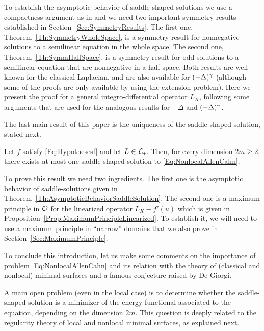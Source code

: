 To establish the asymptotic behavior of saddle-shaped solutions we use a compactness argument as in \cite{CabreTerraII, Cinti-Saddle, Cinti-Saddle2} and we need two important symmetry results established in Section~\ref{Sec:SymmetryResults}. The first one, Theorem~\ref{Th:SymmetryWholeSpace}, is a symmetry result for nonnegative solutions to a semilinear equation in the whole space. The second one, Theorem~\ref{Th:SymmHalfSpace}, is a symmetry result for odd solutions to a semilinear equation that are nonnegative in a half-space. Both results are well known for the classical Laplacian, and are also available for $(-\Delta)^\gamma$ (although some of the proofs are only available by using the extension problem). Here we present the proof for a general integro-differential operator $L_K$, following some arguments that are used for the analogous results for $-\Delta$ and $(-\Delta)^\gamma$.

The last main result of this paper is the uniqueness of the saddle-shaped solution, stated next.

\begin{theorem}
	\label{Th:Uniqueness}
	Let $f$ satisfy \eqref{Eq:Hypothesesf} and let $L\in \mathcal{L}_\star$. Then, for every dimension $2m \geq 2$, there exists at most one saddle-shaped solution to \eqref{Eq:NonlocalAllenCahn}.
\end{theorem}

To prove this result we need two ingredients. The first one is the asymptotic behavior of saddle-solutions given in Theorem~\ref{Th:AsymptoticBehaviorSaddleSolution}. The second one is a maximum principle in $\mathcal{O}$ for the linearized operator $L_K - f'(u)$ which is given in Proposition~\ref{Prop:MaximumPrincipleLinearized}. To establish it, we will need to use a maximum principle in ``narrow'' domains that we also prove in Section~\ref{Sec:MaximumPrinciple}.

To conclude this introduction, let us make some comments on the importance of problem \eqref{Eq:NonlocalAllenCahn} and its relation with the theory of (classical and nonlocal) minimal surfaces and  a famous conjecture raised by De Giorgi.

A main open problem (even in the local case) is to determine whether the saddle-shaped solution is a minimizer of the energy functional associated to the equation, depending on the dimension $2m$. This question is deeply related to the regularity theory of local and nonlocal minimal surfaces, as explained next.

